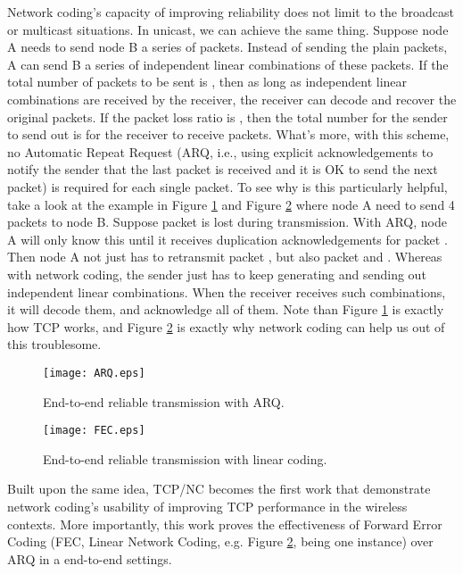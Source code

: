 \documentclass[10pt, conference, final, letterpaper]{IEEEtran}
\theoremstyle{definition}
\begin{document}
Network coding's capacity of improving reliability does not limit to the broadcast or multicast situations. In unicast, we can achieve the same thing. Suppose node A needs to send node B a series of packets. Instead of sending the plain packets, A can send B a series of independent linear combinations of these packets. If the total number of packets to be sent is , then as long as  independent linear combinations are received by the receiver, the receiver can decode and recover the original packets. If the packet loss ratio is , then the total number for the sender to send out is  for the receiver to receive  packets. What's more, with this scheme, no Automatic Repeat Request (ARQ, i.e., using explicit acknowledgements to notify the sender that the last packet is received and it is OK to send the next packet) is required for each single packet. To see why is this particularly helpful, take a look at the example in Figure \ref{fig:ARQ} and Figure \ref{fig:FEC} where node A need to send 4 packets to node B. Suppose packet  is lost during transmission. With ARQ, node A will only know this until it receives duplication acknowledgements for packet . Then node A not just has to retransmit packet , but also packet  and . Whereas with network coding, the sender just has to keep generating and sending out independent linear combinations. When the receiver receives  such combinations, it will decode them, and acknowledge all of them. Note than Figure \ref{fig:ARQ} is exactly how TCP works, and Figure \ref{fig:FEC} is exactly why network coding can help us out of this troublesome.

\begin{figure}[hbt]
	\begin{center}
		\texttt{[image: ARQ.eps]}
	\end{center}
	\caption{End-to-end reliable transmission with ARQ.}
	\label{fig:ARQ}
\end{figure}

\begin{figure}[hbt]
	\begin{center}
		\texttt{[image: FEC.eps]}
	\end{center}
	\caption{End-to-end reliable transmission with linear coding.}
	\label{fig:FEC}
\end{figure}

Built upon the same idea, TCP/NC \cite{TCPNC} becomes the first work that demonstrate network coding's usability of improving TCP performance in the wireless contexts. More importantly, this work proves the effectiveness of Forward Error Coding (FEC, Linear Network Coding, e.g. Figure \ref{fig:FEC}, being one instance) over ARQ in a end-to-end settings.
\end{document}
